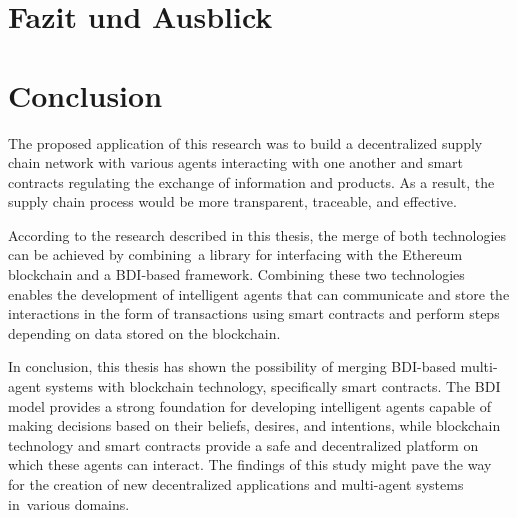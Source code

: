 {\chapter{Fazit und Ausblick}}
{\chapter{Conclusion}}

\label{sec:conclusion}

The proposed application of this research was to build a decentralized supply chain network with various agents interacting with one another and smart contracts regulating the exchange of information and products. As a result, the supply chain process would be more transparent, traceable, and effective. 

\vspace{.5cm}

According to the research described in this thesis, the merge of both technologies can be achieved by combining a library for interfacing with the Ethereum blockchain and a \ac{BDI}-based framework. Combining these two technologies enables the development of intelligent agents that can communicate and store the interactions in the form of transactions using smart contracts and perform steps depending on data stored on the blockchain.

\vspace{.5cm}

In conclusion, this thesis has shown the possibility of merging \ac{BDI}-based multi-agent systems with blockchain technology, specifically smart contracts. The \ac{BDI} model provides a strong foundation for developing intelligent agents capable of making decisions based on their beliefs, desires, and intentions, while blockchain technology and smart contracts provide a safe and decentralized platform on which these agents can interact. The findings of this study might pave the way for the creation of new decentralized applications and multi-agent systems in various domains.


